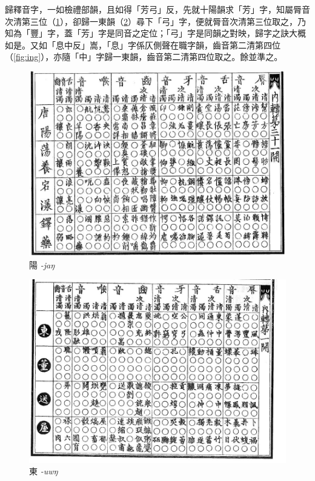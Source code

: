 \documentclass[oneside,a4paper,11pt]{article}
\newcommand{\ipa}[1]{{\phon\textit{#1}}}
\newcommand{\zh}[1]{{\cn #1}}
\newcommand{\zhc}[2]{\zh{#1} \ipa{#2}}
\begin{document}
{\cn
歸釋音字，一如檢禮部韻，且如得「芳弓」反，先就十陽韻求「芳」字，知屬脣音次清第三位（\ref{fig:ang}），卻歸一東韻（\ref{fig:uwng}）尋下「弓」字，便就脣音次清第三位取之，乃知為「豐」字，蓋「芳」字是同音之定位；「弓」字是同韻之對映，歸字之訣大概如是。又如「息中反」嵩，「息」字係仄側聲在職字韻，齒音第二清第四位（\ref{fig:ing}），亦隨「中」字歸一東韻，齒音第二清第四位取之。餘並準之。
\begin{figure}[H]
\centering
\label{fig:ang}
\caption{\zhc{陽}{-jaŋ}}
\includegraphics[width=.9\textwidth]{yunjing-ang.jpg}
\end{figure}
\begin{figure}[H]
\centering
\label{fig:uwng}
\caption{\zhc{東}{-uwŋ}}
\includegraphics[width=.9\textwidth]{yunjing-uwng.jpg}
\end{figure}

}
\end{document}
